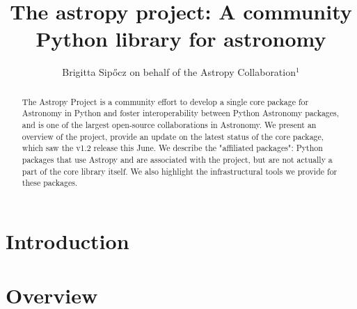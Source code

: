 \documentclass{iau}
\title[The astropy project] %
{The astropy project: A community Python library for astronomy}
\author[Brigitta Sip{\H o}cz on behalf of the Astropy Collaboration] %
{Brigitta Sip{\H o}cz on behalf of the Astropy Collaboration$^1$}
\affiliation{$^1$ email: {\tt bsipocz@gmail.com}}
\begin{document}
\maketitle

\begin{abstract}
The Astropy Project is a community effort to develop a single core package
for Astronomy in Python and foster interoperability between Python Astronomy
packages, and is one of the largest open-source collaborations in
Astronomy. We present an overview of the project, provide an update on the
latest status of the core package, which saw the v1.2 release this June. We
describe the "affiliated packages": Python packages that use Astropy and are
associated with the project, but are not actually a part of the core library
itself. We also highlight the infrastructural tools we provide for these
packages.
\end{abstract}

\firstsection %
\section{Introduction}

\section{Overview}
\end{document}
